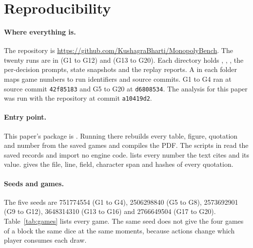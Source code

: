 \section{Reproducibility}
\label{app:repro}

\paragraph{Where everything is.}
The repository is \url{https://github.com/KushagraBharti/MonopolyBench}. The twenty runs are in  (G1 to G12) and  (G13 to G20). Each  directory holds , , , the per-decision prompts, state snapshots and the replay reports. A  in each folder maps game numbers to run identifiers and source commits. G1 to G4 ran at source commit \texttt{42f85183} and G5 to G20 at \texttt{d6808534}. The analysis for this paper was run with the repository at commit \texttt{a10419d2}.

\paragraph{Entry point.}
This paper's package is . Running  there rebuilds every table, figure, quotation and number from the saved games and compiles the PDF. The scripts in  read the saved records and import no engine code.  lists every number the text cites and its value.  gives the file, line, field, character span and hashes of every quotation.

\paragraph{Seeds and games.}
The five seeds are 751774554 (G1 to G4), 2506298840 (G5 to G8), 2573692901 (G9 to G12), 3648314310 (G13 to G16) and 2766649504 (G17 to G20). Table~\ref{tab:games} lists every game. The same seed does not give the four games of a block the same dice at the same moments, because actions change which player consumes each draw.

\begin{table}[ht]\centering\footnotesize
\TableGames
\caption{The twenty games. Seat order lists the systems from first to move. The four rotations keep the cyclic order, so each system always follows the same opponent.}
\label{tab:games}\end{table}

